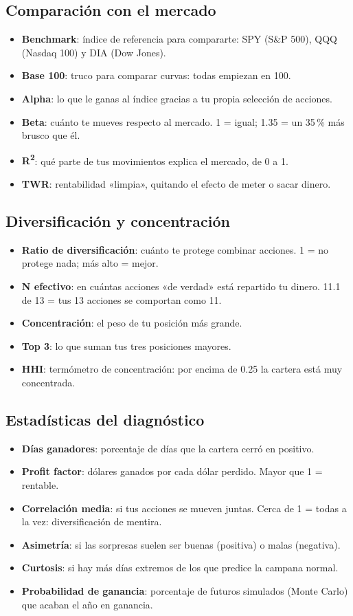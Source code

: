 \documentclass[11pt,a4paper]{article}
\newcommand{\dato}[2]{\item \textbf{#1}: #2}
\begin{document}
\subsection{Comparación con el mercado}
\begin{itemize}
  \dato{Benchmark}{índice de referencia para compararte: SPY (S\&P 500), QQQ (Nasdaq 100) y DIA (Dow Jones).}
  \dato{Base 100}{truco para comparar curvas: todas empiezan en 100.}
  \dato{Alpha}{lo que le ganas al índice gracias a tu propia selección de acciones.}
  \dato{Beta}{cuánto te mueves respecto al mercado. 1 = igual; 1.35 = un 35\,\% más brusco que él.}
  \dato{R\textsuperscript{2}}{qué parte de tus movimientos explica el mercado, de 0 a 1.}
  \dato{TWR}{rentabilidad «limpia», quitando el efecto de meter o sacar dinero.}
\end{itemize}

\subsection{Diversificación y concentración}
\begin{itemize}
  \dato{Ratio de diversificación}{cuánto te protege combinar acciones. 1 = no protege nada; más alto = mejor.}
  \dato{N efectivo}{en cuántas acciones «de verdad» está repartido tu dinero. 11.1 de 13 = tus 13 acciones se comportan como 11.}
  \dato{Concentración}{el peso de tu posición más grande.}
  \dato{Top 3}{lo que suman tus tres posiciones mayores.}
  \dato{HHI}{termómetro de concentración: por encima de 0.25 la cartera está muy concentrada.}
\end{itemize}

\subsection{Estadísticas del diagnóstico}
\begin{itemize}
  \dato{Días ganadores}{porcentaje de días que la cartera cerró en positivo.}
  \dato{Profit factor}{dólares ganados por cada dólar perdido. Mayor que 1 = rentable.}
  \dato{Correlación media}{si tus acciones se mueven juntas. Cerca de 1 = todas a la vez: diversificación de mentira.}
  \dato{Asimetría}{si las sorpresas suelen ser buenas (positiva) o malas (negativa).}
  \dato{Curtosis}{si hay más días extremos de los que predice la campana normal.}
  \dato{Probabilidad de ganancia}{porcentaje de futuros simulados (Monte Carlo) que acaban el año en ganancia.}
\end{itemize}
\end{document}
